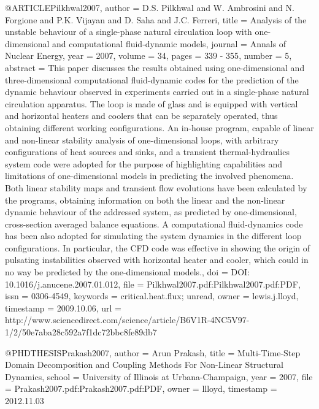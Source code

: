 {{@ARTICLE{Pilkhwal2007,
  author = {D.S. Pilkhwal and W. Ambrosini and N. Forgione and P.K. Vijayan and
	D. Saha and J.C. Ferreri},
  title = {Analysis of the unstable behaviour of a single-phase natural circulation
	loop with one-dimensional and computational fluid-dynamic models},
  journal = {Annals of Nuclear Energy},
  year = {2007},
  volume = {34},
  pages = {339 - 355},
  number = {5},
  abstract = {This paper discusses the results obtained using one-dimensional and
	three-dimensional computational fluid-dynamic codes for the prediction
	of the dynamic behaviour observed in experiments carried out in a
	single-phase natural circulation apparatus. The loop is made of glass
	and is equipped with vertical and horizontal heaters and coolers
	that can be separately operated, thus obtaining different working
	configurations. An in-house program, capable of linear and non-linear
	stability analysis of one-dimensional loops, with arbitrary configurations
	of heat sources and sinks, and a transient thermal-hydraulics system
	code were adopted for the purpose of highlighting capabilities and
	limitations of one-dimensional models in predicting the involved
	phenomena. Both linear stability maps and transient flow evolutions
	have been calculated by the programs, obtaining information on both
	the linear and the non-linear dynamic behaviour of the addressed
	system, as predicted by one-dimensional, cross-section averaged balance
	equations. A computational fluid-dynamics code has been also adopted
	for simulating the system dynamics in the different loop configurations.
	In particular, the CFD code was effective in showing the origin of
	pulsating instabilities observed with horizontal heater and cooler,
	which could in no way be predicted by the one-dimensional models.},
  doi = {DOI: 10.1016/j.anucene.2007.01.012},
  file = {Pilkhwal2007.pdf:Pilkhwal2007.pdf:PDF},
  issn = {0306-4549},
  keywords = {critical.heat.flux; unread},
  owner = {lewis.j.lloyd},
  timestamp = {2009.10.06},
  url = {http://www.sciencedirect.com/science/article/B6V1R-4NC5V97-1/2/50e7aba28c592a7f1dc72bbc8fe89db7}
}

@PHDTHESIS{Prakash2007,
  author = {Arun Prakash},
  title = {Multi-Time-Step Domain Decomposition and Coupling Methods For Non-Linear
	Structural Dynamics},
  school = {University of Illinois at Urbana-Champaign},
  year = {2007},
  file = {Prakash2007.pdf:Prakash2007.pdf:PDF},
  owner = {llloyd},
  timestamp = {2012.11.03}
}

}}
